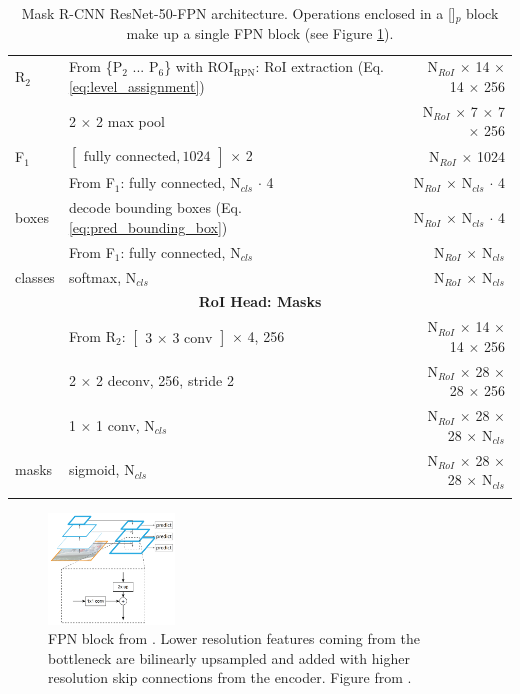 {\begin{longtable}{llr}
\midrule
R$_2$ & From \{P$_2$ ... P$_6$\} with ROI$_{\mathrm{RPN}}$: RoI extraction (Eq. \ref{eq:level_assignment}) & N$_{RoI}$ $\times$ 14 $\times$ 14 $\times$ 256 \\
& 2 $\times$ 2 max pool & N$_{RoI}$ $\times$ 7 $\times$ 7 $\times$ 256 \\
F$_1$ & $\begin{bmatrix}\textrm{fully connected}, 1024\end{bmatrix}$ $\times$ 2 & N$_{RoI}$ $\times$ 1024 \\
& From F$_1$: fully connected, N$_{cls}$ $\cdot$ 4 & N$_{RoI}$ $\times$ N$_{cls}$ $\cdot$ 4 \\
boxes & decode bounding boxes (Eq. \ref{eq:pred_bounding_box}) & N$_{RoI}$ $\times$ N$_{cls}$ $\cdot$ 4\\
& From F$_1$: fully connected, N$_{cls}$ & N$_{RoI}$ $\times$ N$_{cls}$ \\
classes& softmax, N$_{cls}$ & N$_{RoI}$ $\times$ N$_{cls}$ \\
\midrule
\multicolumn{3}{c}{\textbf{RoI Head: Masks}}\\
\midrule
& From R$_2$: $\begin{bmatrix}\textrm{3 $\times$ 3 conv} \end{bmatrix}$ $\times$ 4, 256 & N$_{RoI}$ $\times$ 14 $\times$ 14 $\times$ 256 \\
& 2 $\times$ 2 deconv, 256, stride 2 & N$_{RoI}$ $\times$ 28 $\times$ 28 $\times$ 256 \\
& 1 $\times$ 1 conv, N$_{cls}$ & N$_{RoI}$ $\times$ 28 $\times$ 28 $\times$ N$_{cls}$ \\
masks & sigmoid, N$_{cls}$ & N$_{RoI}$ $\times$ 28 $\times$ 28 $\times$ N$_{cls}$ \\
\bottomrule

\caption {
Mask R-CNN \cite{MaskRCNN} ResNet-50-FPN \cite{ResNet} architecture.
Operations enclosed in a []$_p$ block make up a single FPN
block (see Figure \ref{figure:fpn_block}).
}
\label{table:maskrcnn_resnet_fpn}
\end{longtable}
}

\begin{figure}[t]
  \centering
  \includegraphics[width=0.3\textwidth]{figures/fpn}
\caption{
FPN block from \cite{FPN}.
Lower resolution features coming from the bottleneck are bilinearly upsampled
and added with higher resolution skip connections from the encoder.
Figure from \cite{FPN}.
}
\label{figure:fpn_block}
\end{figure}

